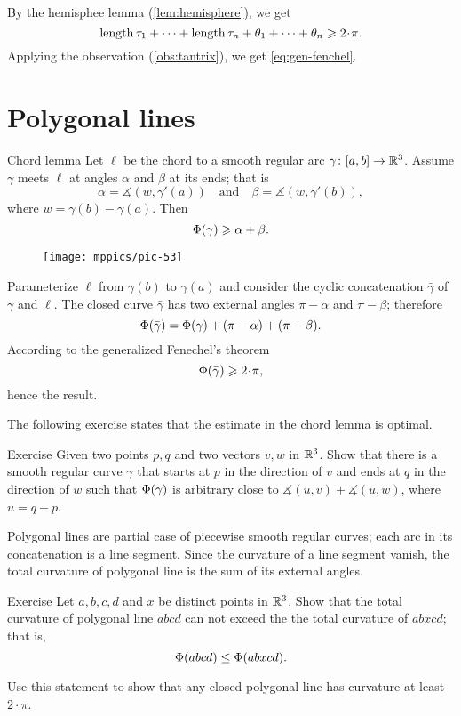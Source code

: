 By the hemisphee lemma (\ref{lem:hemisphere}), we get 
\[\length\tau_1+\dots+\length\tau_n+\theta_1+\dots+\theta_n\ge 2\cdot\pi.\]
Applying the observation (\ref{obs:tantrix}), we get \ref{eq:gen-fenchel}.
\qedsf


\section*{Polygonal lines}


\begin{thm}{Chord lemma}\label{lem:chord}
Let $\ell$ be the chord to a smooth regular arc $\gamma\colon[a,b]\to\mathbb{R}^3$.
Assume $\gamma$ meets $\ell$ at angles $\alpha$ and $\beta$ at its ends;
that is 
\[\alpha=\measuredangle(w,\gamma'(a))\quad\text{and}\quad \beta=\measuredangle(w,\gamma'(b)),\]
where $w=\gamma(b)-\gamma(a)$.
Then 
\[\Phi({\gamma})\geqslant \alpha+\beta.\] 

\end{thm}

\begin{wrapfigure}{r}{45 mm}
\vskip-7mm
\centering
\texttt{[image: mppics/pic-53]}
\vskip0mm
\end{wrapfigure}

Parameterize $\ell$ from $\gamma(b)$ to $\gamma(a)$ and consider the cyclic concatenation $\bar\gamma$ of $\gamma$ and $\ell$.
The closed curve $\bar\gamma$ has two external angles $\pi-\alpha$ and $\pi-\beta$;
therefore 
\[\Phi({\bar\gamma})=\Phi({\gamma})+(\pi-\alpha)+(\pi-\beta).\]
According to the generalized Fenechel's theorem
\[\tc{\bar\gamma}\ge 2\cdot\pi,\]
hence the result.
\qeds

The following exercise states that the estimate in the chord lemma is optimal.

\begin{thm}{Exercise}
Given two points $p, q$ and two vectors $v,w$ in $\mathbb{R}^3$.
Show that there is a smooth regular curve $\gamma$ that starts at $p$ in the direction of $v$ and ends at $q$ in the direction of $w$ such that 
$\Phi({\gamma})$ is arbitrary close to $\measuredangle(u,v)+\measuredangle(u,w)$, where $u=q-p$.

\end{thm}

Polygonal lines are partial case of piecewise smooth regular curves;
each arc in its concatenation is a line segment.
Since the curvature of a line segment vanish, the total curvature of polygonal line is the sum of its external angles.

\begin{thm}{Exercise}\label{ex:monotonic-tc}
Let $a,b,c,d$ and $x$ be distinct points in $\mathbb{R}^3$.
Show that the total curvature of polygonal line $abcd$ can not exceed the the total curvature of $abxcd$; that is, 
\[\Phi({abcd}) \leq \Phi({abxcd}).\]

Use this statement to show that any closed polygonal line has curvature at least $2\cdot\pi$.
\end{thm}

